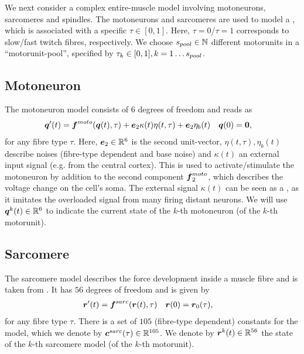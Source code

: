 We next consider a complex entire-muscle model involving motoneurons, sarcomeres and spindles.
The motoneurons and sarcomeres are used to model a , which is associated with a specific  $\tau\in[0,1]$.
Here, $\tau=0$/$\tau=1$ corresponds to slow/fast twitch fibres, respectively.
We choose ${s_{pool}}\in \mathbb{N}$ different motorunits in a ``motorunit-pool'', specified by $\tau_k\in[0,1], k=1\ldots{s_{pool}}$.

\subsection{Motoneuron}
The motoneuron model \cite{Cisi2008, negro2011} consists of $6$ degrees of freedom and reads as
\begin{align}
	\boldsymbol{q}'(t) &= \boldsymbol{f}^{moto}(\boldsymbol{q}(t),\tau) + \boldsymbol{e}_2\kappa(t)\eta(t,\tau) + \boldsymbol{e}_2\eta_b(t) & \boldsymbol{q}(0) &= \boldsymbol{0},\label{def:motosys}
\end{align}
for any fibre type $\tau$.
Here, $\boldsymbol{e}_2\in\mathbb{R}^6$ is the second unit-vector, $\eta(t,\tau),\eta_b(t)$ describe noises (fibre-type dependent and base noise)
and $\kappa(t)$ an external input signal (e.g. from the central cortex).
This is used to activate/stimulate the motoneuron by addition to the second component $\boldsymbol{f}^{moto}_2$, which describes the voltage change on the cell's soma.
The external signal $\kappa(t)$ can be seen as a , as it imitates the overloaded signal from many firing distant neurons.
We will use $\boldsymbol{q}^k(t) \in \mathbb{R}^6$ to indicate the current state of the $k$-th motoneuron (of the $k$-th motorunit).


\subsection{Sarcomere}
The sarcomere model describes the force development inside a muscle fibre and is taken from \cite{Shorten2007}.
It has $56$ degrees of freedom and is given by
\begin{align}
	\boldsymbol{r}'(t) &= \boldsymbol{f}^{sarc}(\boldsymbol{r}(t),\tau) & \boldsymbol{r}(0) &= \boldsymbol{r}_0(\tau),\label{def:sarcosys}
\end{align}
for any fibre type $\tau$.
There is a set of $105$ (fibre-type dependent) constants for the model, which we denote by $\boldsymbol{c}^{sarc}(\tau)\in\mathbb{R}^{105}$.
We denote by $\boldsymbol{r}^k(t)\in\mathbb{R}^{56}$ the state of the $k$-th sarcomere model (of the $k$-th motorunit).

